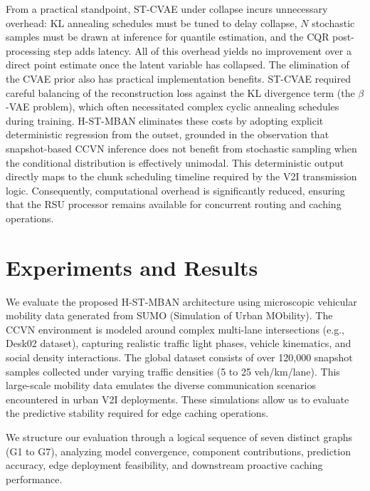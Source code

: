 \documentclass[journal]{IEEEtran}
\begin{document}
From a practical standpoint, ST-CVAE under collapse incurs unnecessary overhead: KL annealing schedules must be tuned to delay collapse, $N$ stochastic samples must be drawn at inference for quantile estimation, and the CQR post-processing step adds latency.
All of this overhead yields no improvement over a direct point estimate once the latent variable has collapsed.
The elimination of the CVAE prior also has practical implementation benefits.
ST-CVAE required careful balancing of the reconstruction loss against the KL divergence term (the $\beta$-VAE problem), which often necessitated complex cyclic annealing schedules during training.
H-ST-MBAN eliminates these costs by adopting explicit deterministic regression from the outset, grounded in the observation that snapshot-based CCVN inference does not benefit from stochastic sampling when the conditional distribution is effectively unimodal.
This deterministic output directly maps to the chunk scheduling timeline required by the V2I transmission logic.
Consequently, computational overhead is significantly reduced, ensuring that the RSU processor remains available for concurrent routing and caching operations.


\section{Experiments and Results}\label{sec:experiments}

We evaluate the proposed H-ST-MBAN architecture using microscopic vehicular mobility data generated from SUMO (Simulation of Urban MObility).
The CCVN environment is modeled around complex multi-lane intersections (e.g., Desk02 dataset), capturing realistic traffic light phases, vehicle kinematics, and social density interactions.
The global dataset consists of over 120,000 snapshot samples collected under varying traffic densities (5 to 25 veh/km/lane).
This large-scale mobility data emulates the diverse communication scenarios encountered in urban V2I deployments.
These simulations allow us to evaluate the predictive stability required for edge caching operations.

We structure our evaluation through a logical sequence of seven distinct graphs (G1 to G7), analyzing model convergence, component contributions, prediction accuracy, edge deployment feasibility, and downstream proactive caching performance.
\end{document}
